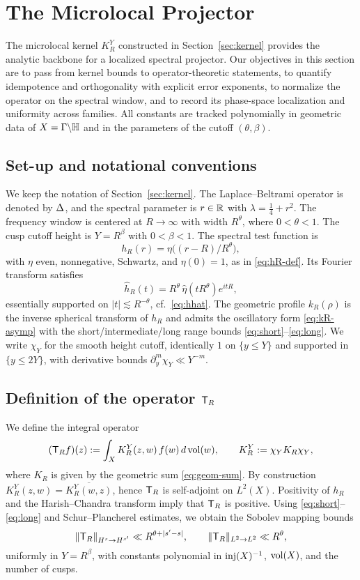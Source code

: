 \section{The Microlocal Projector}\label{sec:projector}

The microlocal kernel $K_R^Y$ constructed in Section~\ref{sec:kernel} provides the analytic backbone for a localized spectral projector.
Our objectives in this section are to pass from kernel bounds to operator-theoretic statements, to quantify idempotence and orthogonality with explicit error exponents, to normalize the operator on the spectral window, and to record its phase-space localization and uniformity across families.
All constants are tracked polynomially in geometric data of $X=\Gamma\backslash\mathbb{H}$ and in the parameters of the cutoff $(\theta,\beta)$.

\subsection{Set-up and notational conventions}\label{subsec:proj-setup}
We keep the notation of Section~\ref{sec:kernel}.
The Laplace–Beltrami operator is denoted by $\Delta$, and the spectral parameter is $r\in\mathbb{R}$ with $\lambda=\tfrac14+r^2$.
The frequency window is centered at $R\to\infty$ with width $R^\theta$, where $0<\theta<1$.
The cusp cutoff height is $Y=R^\beta$ with $0<\beta<1$.
The spectral test function is
\[
h_R(r)=\eta\!\big((r-R)/R^\theta\big),
\]
with $\eta$ even, nonnegative, Schwartz, and $\eta(0)=1$, as in \eqref{eq:hR-def}.
Its Fourier transform satisfies
\[
\widehat{h}_R(t)=R^\theta\,\widehat{\eta}(tR^\theta)e^{itR},
\]
essentially supported on $|t|\lesssim R^{-\theta}$, cf.\ \eqref{eq:hhat}.
The geometric profile $k_R(\rho)$ is the inverse spherical transform of $h_R$ and admits the oscillatory form \eqref{eq:kR-asymp} with the short/intermediate/long range bounds \eqref{eq:short}–\eqref{eq:long}.
We write $\chi_Y$ for the smooth height cutoff, identically $1$ on $\{y\le Y\}$ and supported in $\{y\le 2Y\}$, with derivative bounds $\partial_y^m\chi_Y\ll Y^{-m}$.

\subsection{Definition of the operator \texorpdfstring{$\mathsf{T}_R$}{TR}}\label{subsec:proj-def}
We define the integral operator
\begin{equation}\label{eq:TR-def}
(\mathsf{T}_R f)(z):=\int_X K_R^Y(z,w)\,f(w)\,d\operatorname{vol}(w),
\qquad
K_R^Y:=\chi_Y K_R \chi_Y,
\end{equation}
where $K_R$ is given by the geometric sum \eqref{eq:geom-sum}.
By construction $K_R^Y(z,w)=\overline{K_R^Y(w,z)}$, hence $\mathsf{T}_R$ is self-adjoint on $L^2(X)$.
Positivity of $h_R$ and the Harish–Chandra transform imply that $\mathsf{T}_R$ is positive.
Using \eqref{eq:short}–\eqref{eq:long} and Schur–Plancherel estimates, we obtain the Sobolev mapping bounds
\begin{equation}\label{eq:TR-sobolev}
\|\mathsf{T}_R\|_{H^s\to H^{s'}}\ll R^{\theta+|s'-s|},
\qquad
\|\mathsf{T}_R\|_{L^2\to L^2}\ll R^\theta,
\end{equation}
uniformly in $Y=R^\beta$, with constants polynomial in $\mathrm{inj}(X)^{-1}$, $\operatorname{vol}(X)$, and the number of cusps.

